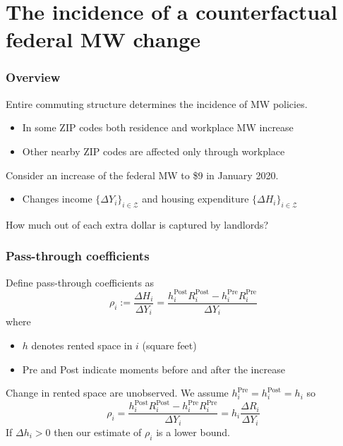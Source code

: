 \documentclass[aspectratio=169, t]{beamer}
\newcommand{\Z}{\mathcal{Z}}
\begin{document}
\section{The incidence of a counterfactual federal MW change}

\begin{frame}
    \frametitle{Overview}
    
    Entire commuting structure determines the incidence of MW policies.
    \begin{itemize}
    	\vspace{1mm}
    	\item In some ZIP codes both residence and workplace MW increase
    	\vspace{1mm}
    	\item Other nearby ZIP codes are affected only through workplace
    \end{itemize}
    
    \pause
    \vspace{3mm}
    Consider an increase of the federal MW to \$9 in January 2020.
    \begin{itemize}
    	\vspace{1mm}
    	\item Changes income $\{\Delta Y_i\}_{i\in\Z}$ and housing expenditure $\{\Delta H_i\}_{i\in\Z}$
    \end{itemize}
    
    \pause
    \vspace{3mm}
    How much out of each extra dollar is captured by landlords?
   
\end{frame}

\begin{frame}
	\frametitle{Pass-through coefficients}

	Define pass-through coefficients as	
	\begin{equation*}
		\rho_i := \frac{\Delta H_i}{\Delta Y_i} =  \frac{h^{\text{Post}}_i R^{\text{Post}}_i - h^{\text{Pre}}_i R^{\text{Pre}}_i}{\Delta Y_i}
	\end{equation*}
	where 
	\begin{itemize}
		\item $h$ denotes rented space in $i$ (square feet)
		\item Pre and Post indicate moments before and after the increase
	\end{itemize}

	\pause
	\vspace{3mm}
	Change in rented space are unobserved. We assume $h^{\text{Pre}}_i = h^{\text{Post}}_i = h_i$ so
	\begin{equation*}
		\rho_i = \frac{h^{\text{Post}}_i R^{\text{Post}}_i - h^{\text{Pre}}_i R^{\text{Pre}}_i}{\Delta Y_i} = h_i \frac{\Delta R_i}{\Delta Y_i}
	\end{equation*}
	If $\Delta h_i > 0$ then our estimate of $\rho_i$ is a lower bound.

\end{frame}
\end{document}
